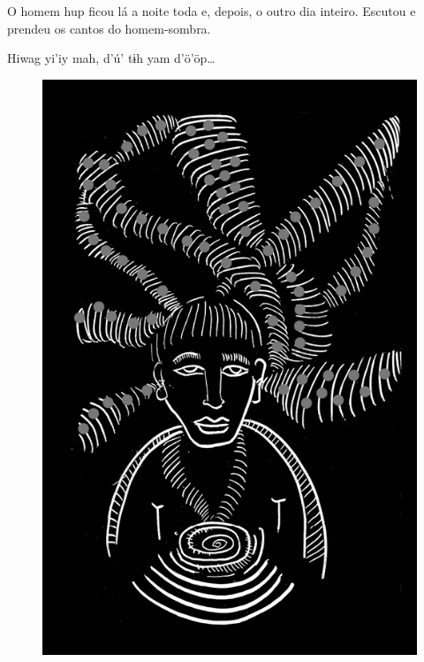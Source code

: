 \chapter*{}

\mbox{}\vspace*{\fill}

O homem hup ficou
lá a noite toda e,
depois, o outro dia
inteiro. Escutou e
prendeu os cantos
do homem-sombra.

\bigskip

Hiwag yi’iy mah,
d’ú’ tɨh yam d’ö’öp\ldots{}

\vspace*{\fill}

\begin{figure}
\vspace*{-1.2cm}
\hspace*{-2.2cm}\includegraphics[width=138mm]{./imgs/img4.jpg}
\end{figure}

